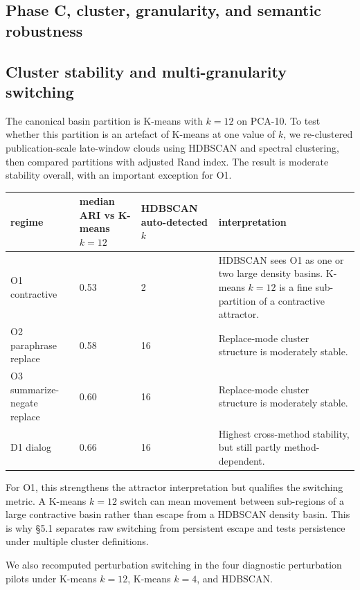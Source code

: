 \documentclass{article}
\theoremstyle{plain}
\theoremstyle{definition}
\begin{document}
\subsection*{Phase C, cluster, granularity, and semantic robustness}

\subsection{Cluster stability and multi-granularity switching}

The canonical basin partition is K-means with $k=12$ on PCA-10. To test whether this partition is an artefact of K-means at one value of $k$, we re-clustered publication-scale late-window clouds using HDBSCAN and spectral clustering, then compared partitions with adjusted Rand index. The result is moderate stability overall, with an important exception for O1.

\begin{table}[h!]
\centering
\small
\begin{tabularx}{\textwidth}{lYYY}
\toprule
regime & median ARI vs K-means $k=12$ & HDBSCAN auto-detected $k$ & interpretation \\
\midrule
O1 contractive & 0.53 & 2 & HDBSCAN sees O1 as one or two large density basins. K-means $k=12$ is a fine sub-partition of a contractive attractor. \\
O2 paraphrase replace & 0.58 & 16 & Replace-mode cluster structure is moderately stable. \\
O3 summarize-negate replace & 0.60 & 16 & Replace-mode cluster structure is moderately stable. \\
D1 dialog & 0.66 & 16 & Highest cross-method stability, but still partly method-dependent. \\
\bottomrule
\end{tabularx}
\end{table}

For O1, this strengthens the attractor interpretation but qualifies the switching metric. A K-means $k=12$ switch can mean movement between sub-regions of a large contractive basin rather than escape from a HDBSCAN density basin. This is why §5.1 separates raw switching from persistent escape and tests persistence under multiple cluster definitions.

We also recomputed perturbation switching in the four diagnostic perturbation pilots under K-means $k=12$, K-means $k=4$, and HDBSCAN.
\end{document}
